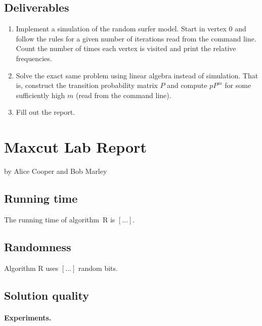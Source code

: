 \documentclass{tufte-handout}
\begin{document}
\subsection{Deliverables}

\begin{enumerate}
\item Implement a simulation of the random surfer model. 
  Start in
  vertex 0 and follow the rules for a given number of iterations read
  from the command line. Count the number of times each vertex is
  visited and print the relative frequencies.
\item Solve the exact same problem using linear algebra instead of
  simulation.
  That is, construct the transition probability matrix $P$ and
  compute $pP^m$ for some sufficiently high $m$ (read from the command
  line).
\item Fill out the report.
\end{enumerate}


\newpage
\section{Maxcut Lab Report}


by Alice Cooper and Bob Marley

\subsection{Running time}

The running time of algorithm~R is $[\ldots]$.

\subsection{Randomness}

Algorithm R uses $[\ldots]$ random bits.

\subsection{Solution quality}

\paragraph{Experiments.}
\end{document}
